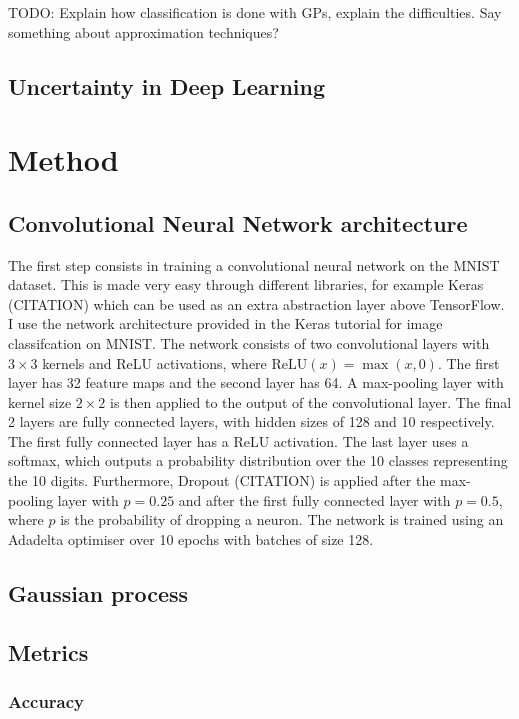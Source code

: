 \documentclass{article}
\begin{document}
TODO: Explain how classification is done with GPs, explain the difficulties. Say something about approximation techniques?

\subsection{Uncertainty in Deep Learning}

\section{Method}
\subsection{Convolutional Neural Network architecture}
The first step consists in training a convolutional neural network on the MNIST dataset. This is made very easy through different libraries, for example Keras (CITATION) which can be used as an extra abstraction layer above TensorFlow. I use the network architecture provided in the Keras tutorial for image classifcation on MNIST. The network consists of two convolutional layers with $3 \times 3$ kernels and ReLU activations, where $\textrm{ReLU}(x) = \max(x, 0)$. The first layer has 32 feature maps and the second layer has 64. A max-pooling layer with kernel size $2 \times 2$ is then applied to the output of the convolutional layer. The final 2 layers are fully connected layers, with hidden sizes of 128 and 10 respectively. The first fully connected layer has a ReLU activation. The last layer uses a softmax, which outputs a probability distribution over the 10 classes representing the 10 digits. Furthermore, Dropout (CITATION) is applied after the max-pooling layer with $p=0.25$ and after the first fully connected layer with $p=0.5$, where $p$ is the probability of dropping a neuron. The network is trained using an Adadelta optimiser over 10 epochs with batches of size 128.

\subsection{Gaussian process}

\subsection{Metrics}
\subsubsection{Accuracy}
\end{document}
